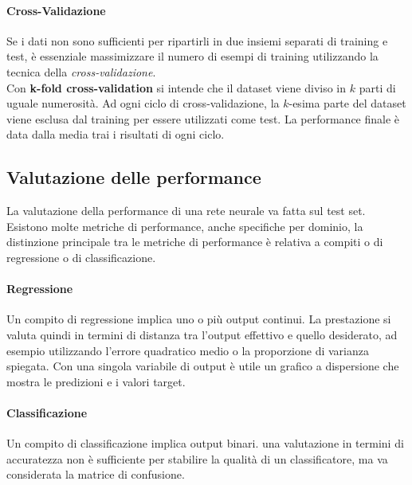\paragraph{Cross-Validazione}
Se i dati non sono sufficienti per ripartirli in due insiemi separati di training e test, è essenziale massimizzare il numero di esempi di training utilizzando la tecnica della \textit{cross-validazione}.\\
Con \textbf{k-fold cross-validation} si intende che il dataset viene diviso in \(k\) parti di uguale numerosità. Ad ogni ciclo di cross-validazione, la \(k\)-esima parte del dataset viene esclusa dal training per essere utilizzati come test. La performance finale è data dalla media trai i risultati di ogni ciclo.

\subsection{Valutazione delle performance}
La valutazione della performance di una rete neurale va fatta sul test set. Esistono molte metriche di performance, anche specifiche per dominio, la distinzione principale tra le metriche di performance è relativa a compiti o di regressione o di classificazione.\\
\paragraph{Regressione} Un compito di regressione implica uno o più output continui. La prestazione si valuta quindi in termini di distanza tra l'output effettivo e quello desiderato, ad esempio utilizzando l'errore quadratico medio o la proporzione di varianza spiegata. Con una singola variabile di output è utile un grafico a dispersione che mostra le predizioni e i valori target.
\paragraph{Classificazione} Un compito di classificazione implica output binari. una valutazione in termini di accuratezza non è sufficiente per stabilire la qualità di un classificatore, ma va considerata la matrice di confusione.

